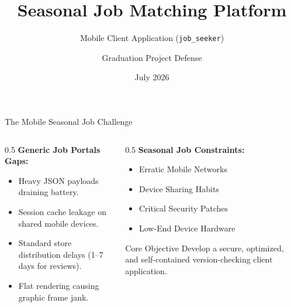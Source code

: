 \documentclass[10pt]{beamer}
\title[Seasonal Job Mobile Client]{Seasonal Job Matching Platform}
\subtitle{Mobile Client Application (\texttt{job\_seeker})}
\author[Graduation Project]{Graduation Project Defense}
\institute[Dept. of Computer Engineering]{
    Department of Computer Engineering\\
    Faculty of Engineering
}
\date[July 2026]{July 2026}
\begin{document}
\begin{frame}[plain]
    \titlepage
\end{frame}

\begin{frame}{The Mobile Seasonal Job Challenge}
    \begin{columns}
        \begin{column}{0.5\textwidth}
            \textbf{Generic Job Portals Gaps:}
            \begin{itemize}
                \item Heavy JSON payloads draining battery.
                \item Session cache leakage on shared mobile devices.
                \item Standard store distribution delays (1--7 days for reviews).
                \item Flat rendering causing graphic frame jank.
            \end{itemize}
        \end{column}
        \begin{column}{0.5\textwidth}
            \textbf{Seasonal Job Constraints:}
            \begin{itemize}
                \item \color{accentred}Erratic Mobile Networks
                \item \color{accentred}Device Sharing Habits
                \item \color{accentred}Critical Security Patches
                \item \color{accentred}Low-End Device Hardware
            \end{itemize}
            \vspace{0.1in}
            \begin{block}{Core Objective}
                Develop a secure, optimized, and self-contained version-checking client application.
            \end{block}
        \end{column}
    \end{columns}
\end{frame}
\end{document}
